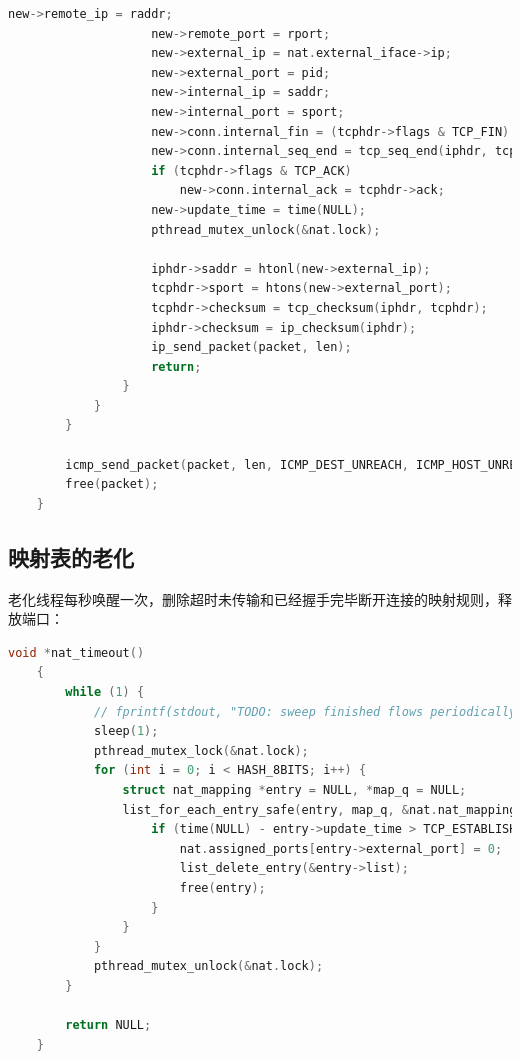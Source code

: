 \documentclass[UTF8]{report}
\begin{document}
\begin{lstlisting}[language=C]
                    new->remote_ip = raddr;
                    new->remote_port = rport;
                    new->external_ip = nat.external_iface->ip;
                    new->external_port = pid;
                    new->internal_ip = saddr;
                    new->internal_port = sport;
                    new->conn.internal_fin = (tcphdr->flags & TCP_FIN) != 0;
                    new->conn.internal_seq_end = tcp_seq_end(iphdr, tcphdr);
                    if (tcphdr->flags & TCP_ACK)
                        new->conn.internal_ack = tcphdr->ack;
                    new->update_time = time(NULL);
                    pthread_mutex_unlock(&nat.lock);
    
                    iphdr->saddr = htonl(new->external_ip);
                    tcphdr->sport = htons(new->external_port);
                    tcphdr->checksum = tcp_checksum(iphdr, tcphdr);
                    iphdr->checksum = ip_checksum(iphdr);
                    ip_send_packet(packet, len);
                    return;
                }
            }
        }
    
        icmp_send_packet(packet, len, ICMP_DEST_UNREACH, ICMP_HOST_UNREACH);
        free(packet);
    }    
\end{lstlisting}

\subsection{映射表的老化}

老化线程每秒唤醒一次，删除超时未传输和已经握手完毕断开连接的映射规则，释放端口：

\begin{lstlisting}[language=C]
    void *nat_timeout()
    {
        while (1) {
            // fprintf(stdout, "TODO: sweep finished flows periodically.\n");
            sleep(1);
            pthread_mutex_lock(&nat.lock);
            for (int i = 0; i < HASH_8BITS; i++) {
                struct nat_mapping *entry = NULL, *map_q = NULL;
                list_for_each_entry_safe(entry, map_q, &nat.nat_mapping_list[i], list) {
                    if (time(NULL) - entry->update_time > TCP_ESTABLISHED_TIMEOUT || is_flow_finished(&entry->conn)) {
                        nat.assigned_ports[entry->external_port] = 0;
                        list_delete_entry(&entry->list);
                        free(entry);
                    }
                }
            }
            pthread_mutex_unlock(&nat.lock);
        }
    
        return NULL;
    }
\end{lstlisting}
\end{document}
